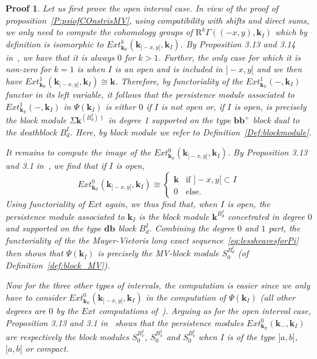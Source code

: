 \documentclass[a4paper, english, 11pt]{article}
\newcommand{\kk}[0]{\textbf{k}}
\newcommand{\0}{\vec{0}}
\newcommand{\R}[0]{\mathbb{R}}
\newcommand{\Rr}[0]{\text{R}}
\newtheorem*{pf}{Proof} }
\begin{document}
\begin{pf}Let us first prove the open interval case.
In view of the proof of proposition~\ref{P:psiofCOnstrisMV}, using compatibility with shifts and direct sums, we only need to compute the cohomology groups of $\Rr^k\Gamma \left ( (-x,y) , \kk_{I}\right )$ which by definition is isomorphic to 
$Ext^k_{\kk_\R}\left( \kk_{]-x,y[}, \kk_{I }\right) $. 
By Proposition 3.13 and 3.14 in~\cite{Berk18}, we have that it is always $0$ for $k>1$. Further, the only case for which it is non-zero for $k=1$ is when $I$ is an open and is included in $]-x,y[$ and we then have $Ext^1_{\kk_\R}\left( \kk_{]-x,y[}, \kk_{I }\right) \cong \kk $.  Therefore, by functoriality of the $Ext^1_{\kk_\R}( -, \kk_I)$ functor in its left variable, it follows that the persistence module associated to  
$Ext^1_{\kk_\R}( -, \kk_I)$ in $\Psi(\kk_I)$ is either $0$ if $I$ is not open or, if $I$ is open, is precisely the block module $\Sigma \kk^{(B_d^{I})\dag}$ in degree 1 supported on the type $\textbf{bb}^{+}$ block dual to the deathblock $B_d^{I}$. Here, by block module we refer to Definition~\ref{Def:blockmodule}.

It remains to compute the image of the $Ext^0_{\kk_\R}\left( \kk_{]-x,y[}, \kk_{I }\right) $. By Proposition 3.13 and 3.1 in~\cite{Berk18}, we find that if $I$ is open, 
$$Ext^0_{\kk_\R}\left( \kk_{]-x,y[}, \kk_{I }\right) \cong \left \{ \begin{array}{ll}
\kk & \mbox{if } ]-x, y[ \subset I \\ 0 & \mbox{else. }
\end{array}\right .$$
Using functoriality of $Ext$ again, we thus find that, when $I$ is open, the persistence module associated to $\kk_I$ is the block module $ \kk^{B_d^I}$ concetrated in degree $0$ and supported on the type $\textbf{db}$ block $B_d^I$. Combining the degree $0$ and $1$ part, 
the functoriality of the the Mayer-Vietoris long exact sequence~\eqref{eq:lessheavesforPi} then shows that $\Psi(\kk_I) $ is precisely the MV-block module $S_0^{B_d^I}$ (of Definition~\ref{def:block_MV}). 

Now for the three other types of intervals, the computation is easier since we only have to consider $Ext^0_{\kk_\R}\left( \kk_{]-x,y[}, \kk_{I }\right)$ in the computation of $\Psi(\kk_I)$ (all other degrees are $0$ by the $Ext$ computations of~\cite{Berk18}). Arguing as for the open interval case, Proposition 3.13 and 3.1 in~\cite{Berk18} shows that the persistence modules $Ext^0_{\kk_\R}\left( \kk_{-}, \kk_{I }\right)$ are respectively the block modules $S_0^{B_v^I}$, $S_0^{B_h^I}$ and 
$S_0^{B_b^I}$ when $I$ is of the type $]a, b]$, $[a, b[$ or compact. 
\end{pf}
\end{document}
